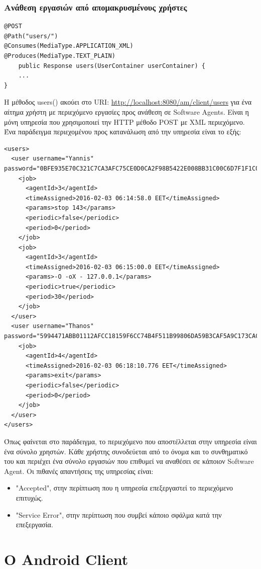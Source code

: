 \documentclass[a4paper,11pt]{article}
\begin{document}
\begin{sloppypar}
\subsubsection{Ανάθεση εργασιών από απομακρυσμένους χρήστες}
\begin{lstlisting}
@POST
@Path("users/")
@Consumes(MediaType.APPLICATION_XML)
@Produces(MediaType.TEXT_PLAIN)
    public Response users(UserContainer userContainer) {
    ...
}
\end{lstlisting}
Η μέθοδος users() ακούει στο URI: \url{http://localhost:8080/am/client/users} για ένα αίτημα χρήστη με περιεχόμενο εργασίες προς ανάθεση σε Software Agents. Είναι η μόνη υπηρεσία που χρησιμοποιεί την HTTP μέθοδο POST με XML περιεχόμενο.
Ένα παράδειγμα περιεχομένου προς κατανάλωση από την υπηρεσία είναι το εξής:
\begin{lstlisting}
<users>
  <user username="Yannis"
password="0BFE935E70C321C7CA3AFC75CE0D0CA2F98B5422E008BB31C00C6D7F1F1C0AD6">
    <job>
      <agentId>3</agentId>
      <timeAssigned>2016-02-03 06:14:58.0 EET</timeAssigned>
      <params>stop 143</params>
      <periodic>false</periodic>
      <period>0</period>
    </job>
    <job>
      <agentId>3</agentId>
      <timeAssigned>2016-02-03 06:15:00.0 EET</timeAssigned>
      <params>-O -oX - 127.0.0.1</params>
      <periodic>true</periodic>
      <period>30</period>
    </job>
  </user>
  <user username="Thanos"
password="5994471ABB01112AFCC18159F6CC74B4F511B99806DA59B3CAF5A9C173CACFC5">
    <job>
      <agentId>4</agentId>
      <timeAssigned>2016-02-03 06:18:10.776 EET</timeAssigned>
      <params>exit</params>
      <periodic>false</periodic>
      <period>0</period>
    </job>
  </user>
</users>
\end{lstlisting}

Όπως φαίνεται στο παράδειγμα, το περιεχόμενο που αποστέλλεται στην υπηρεσία είναι ένα σύνολο χρηστών. Κάθε χρήστης συνοδεύεται από το όνομα και το συνθηματικό του και περιέχει ένα σύνολο εργασιών που επιθυμεί να αναθέσει σε κάποιον Software Agent. Οι πιθανές απαντήσεις της υπηρεσίας είναι:
\begin{itemize}
\item "Accepted", στην περίπτωση που η υπηρεσία επεξεργαστεί το περιεχόμενο επιτυχώς.
\item "Service Error", στην περίπτωση που συμβεί κάποιο σφάλμα κατά την επεξεργασία.
\end{itemize}

\newpage

\section{Ο Android Client}



\end{sloppypar}
\end{document}
